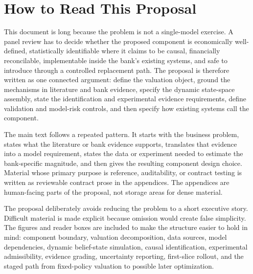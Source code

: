 \documentclass[11pt]{article}
\newcommand{\1}{\mathbf{1}}
\begin{document}
\begin{abstract}
The proposal also states what evidence the component may consume. A
statistically clean experiment is not admissible production evidence unless the
population, action set, customer-impact controls, compliance constraints,
fair-lending and adverse-action boundaries, privacy limits, servicing capacity,
complaint monitoring, and reputation guardrails are approved for the decision
context. Predictive, observationally adjusted, quasi-experimental, randomized,
and scenario-only evidence receive different output labels. The first
production slice should therefore be deliberately narrow: a controlled batch
acquisition or prescreen use case with one offer family, frozen feature
snapshots, preserved holdouts or randomized contact-suppress cells, shadow
scoring against the current component, and finance/risk reconciliation before
cutover.
\end{abstract}

\section*{How to Read This Proposal}

This document is long because the problem is not a single-model exercise. A
panel review has to decide whether the proposed component is economically
well-defined, statistically identifiable where it claims to be causal,
financially reconcilable, implementable inside the bank's existing systems, and
safe to introduce through a controlled replacement path. The proposal is
therefore written as one connected argument: define the valuation object,
ground the mechanisms in literature and bank evidence, specify the dynamic
state-space assembly, state the identification and experimental evidence
requirements, define validation and model-risk controls, and then specify how
existing systems call the component.

The main text follows a repeated pattern. It starts with the business problem,
states what the literature or bank evidence supports, translates that evidence
into a model requirement, states the data or experiment needed to estimate the
bank-specific magnitude, and then gives the resulting component design choice.
Material whose primary purpose is reference, auditability, or contract testing
is written as reviewable contract prose in the appendices. The appendices are
human-facing parts of the proposal, not storage areas for dense material.

The proposal deliberately avoids reducing the problem to a short executive
story. Difficult material is made explicit because omission would create false
simplicity. The figures and reader boxes are included to make the structure
easier to hold in mind: component boundary, valuation decomposition, data
sources, model dependencies, dynamic belief-state simulation, causal
identification, experimental admissibility, evidence grading, uncertainty
reporting, first-slice rollout, and the staged path from fixed-policy valuation
to possible later optimization.
\end{document}
